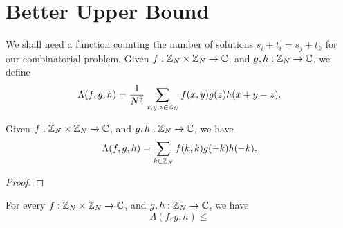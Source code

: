 \section{Better Upper Bound}
We shall need a function counting the number of solutions $ s_i +t_i = s_j + t_k $ for our combinatorial problem. Given $ f : {\mathbb Z}_N \times {\mathbb Z}_N \rightarrow {\mathbb C} $, and $ g, h : {\mathbb Z}_N \rightarrow {\mathbb C} $, we define
$$ \Lambda(f,g,h) = \frac{1}{N^3} \sum\limits_{x,y,z \in {\mathbb Z}_N} f(x,y) g(z) h(x+y-z) .$$

\begin{lemma}
	Given $ f : {\mathbb Z}_N \times {\mathbb Z}_N \rightarrow {\mathbb C} $, and $ g, h : {\mathbb Z}_N \rightarrow {\mathbb C} $, we have
	$$ \Lambda(f,g,h) = \sum\limits_{k \in {\mathbb Z}_N} f(k,k) g(-k) h(-k) .$$
\end{lemma}
\begin{proof}
\end{proof}

\begin{lemma} \label{L2-ineq}
	For every $ f : {\mathbb Z}_N \times {\mathbb Z}_N \rightarrow {\mathbb C} $, and $ g, h : {\mathbb Z}_N \rightarrow {\mathbb C} $, we have
	$$ \Lambda(f,g,h) \leq  $$
\end{lemma}